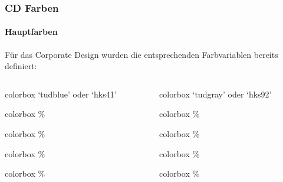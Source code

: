 \documentclass[german,notoc]{tudbeamer}%
\begin{document}
\begin{frame}
	\frametitle{CD Farben}
	\framesubtitle{Hauptfarben}
	Für das Corporate Design wurden die entsprechenden Farbvariablen bereits definiert:
	\begin{columns}[t]
		\begin{column}{.4\textwidth}%
			\begin{beamercolorbox}[wd=0.9\textwidth,sep=1em]{colorbox}
				\centering `tudblue' oder `hks41'
		    \end{beamercolorbox}
			\begin{beamercolorbox}[wd=0.9\textwidth,sep=1em]{colorbox}
				\%
		    \end{beamercolorbox}
			\begin{beamercolorbox}[wd=0.9\textwidth,sep=1em]{colorbox}
				\%
		    \end{beamercolorbox}
			\begin{beamercolorbox}[wd=0.9\textwidth,sep=1em]{colorbox}
				\%
		    \end{beamercolorbox}
			\begin{beamercolorbox}[wd=0.9\textwidth,sep=1em]{colorbox}
				\%
		    \end{beamercolorbox}
		\end{column}

		\begin{column}{.4\textwidth}%
			\begin{beamercolorbox}[wd=0.9\textwidth,sep=1em]{colorbox}
				\centering `tudgray' oder `hks92'
		    \end{beamercolorbox}
			\begin{beamercolorbox}[wd=0.9\textwidth,sep=1em]{colorbox}
				\%
		    \end{beamercolorbox}
			\begin{beamercolorbox}[wd=0.9\textwidth,sep=1em]{colorbox}
				\%
		    \end{beamercolorbox}
			\begin{beamercolorbox}[wd=0.9\textwidth,sep=1em]{colorbox}
				\%
		    \end{beamercolorbox}
			\begin{beamercolorbox}[wd=0.9\textwidth,sep=1em]{colorbox}
				\%
		    \end{beamercolorbox}
		\end{column}
	\end{columns}
\end{frame}
\end{document}
